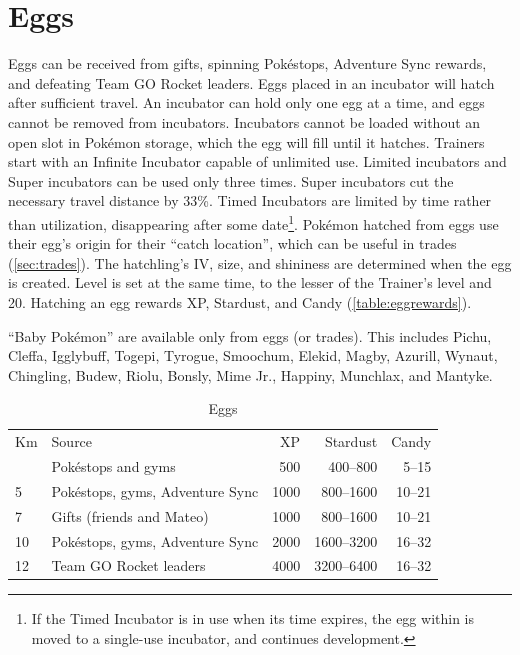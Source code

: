 \section{Eggs\label{sec:eggs}}
Eggs can be received from gifts, spinning Pokéstops, Adventure Sync rewards,
  and defeating Team GO Rocket leaders.
Eggs placed in an incubator will hatch after sufficient travel.
An incubator can hold only one egg at a time, and eggs cannot be removed from incubators.
Incubators cannot be loaded without an open slot in Pokémon storage, which the egg will fill
 until it hatches.
Trainers start with an Infinite Incubator capable of unlimited use.
Limited incubators and Super incubators can be used only three times.
Super incubators cut the necessary travel distance by 33\%.
Timed Incubators are limited by time rather than utilization, disappearing after some date\footnote{If the Timed Incubator is in use when its time expires, the egg within is moved to a single-use incubator, and continues development.}.
Pokémon hatched from eggs use their egg's origin for their ``catch location'',
 which can be useful in trades (\autoref{sec:trades}).
The hatchling's IV, size, and shininess are determined when the egg is created.
Level is set at the same time, to the lesser of the Trainer's level and 20.
Hatching an egg rewards XP, Stardust, and Candy (\autoref{table:eggrewards}).
\begin{tipbox}[title=Baby Pokémon]
``Baby Pokémon'' are available only from eggs (or trades).
This includes Pichu, Cleffa, Igglybuff, Togepi, Tyrogue, Smoochum, Elekid, Magby,
 Azurill, Wynaut, Chingling, Budew, Riolu, Bonsly, Mime Jr., Happiny, Munchlax, and Mantyke.
\end{tipbox}
\begin{table}
\centering
\begin{tabular}{llrrr}
Km & Source & XP & Stardust & Candy\\
\Midrule
  2 & Pokéstops and gyms & 500 & 400--800 & 5--15\\
  5 & Pokéstops, gyms, Adventure Sync & 1000 & 800--1600 & 10--21\\
  7 & Gifts (friends and Mateo) & 1000 & 800--1600 & 10--21\\
  10 & Pokéstops, gyms, Adventure Sync & 2000 & 1600--3200 & 16--32\\
  12 & Team GO Rocket leaders & 4000 & 3200--6400 & 16--32\\
\end{tabular}
\caption{Eggs\label{table:eggrewards}}
\end{table}

